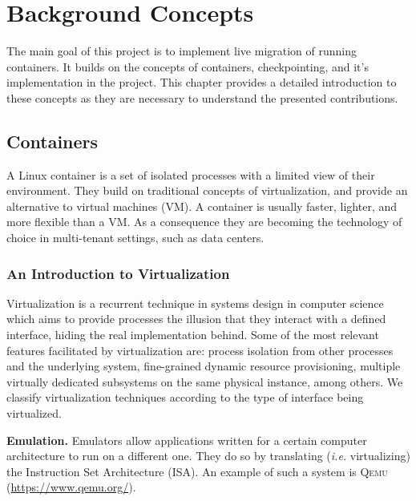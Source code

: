 \chapter{Background Concepts} \label{chap:background}

The main goal of this project is to implement live migration of running containers.
It builds on the concepts of containers, checkpointing, and it's implementation in the \criu project.
This chapter provides a detailed introduction to these concepts as they are necessary to understand the presented contributions.

\section{Containers} \label{sec:containers}

A Linux container is a set of isolated processes with a limited view of their environment.
They build on traditional concepts of virtualization, and provide an alternative to virtual machines (VM).
A container is usually faster, lighter, and more flexible than a VM.
As a consequence they are becoming the technology of choice in multi-tenant settings, such as data centers.

\subsection{An Introduction to Virtualization}

Virtualization is a recurrent technique in systems design in computer science which aims to provide processes the illusion that they interact with a defined interface, hiding the real implementation behind.
Some of the most relevant features facilitated by virtualization are: process isolation from other processes and the underlying system, fine-grained dynamic resource provisioning, multiple virtually dedicated subsystems on the same physical instance, among others.
We classify virtualization techniques according to the type of interface being virtualized.

\textbf{Emulation.}
Emulators allow applications written for a certain computer architecture to run on a different one.
They do so by translating (\textit{i.e.} virtualizing) the Instruction Set Architecture (ISA).
An example of such a system is \textsc{Qemu} (\url{https://www.qemu.org/}).

